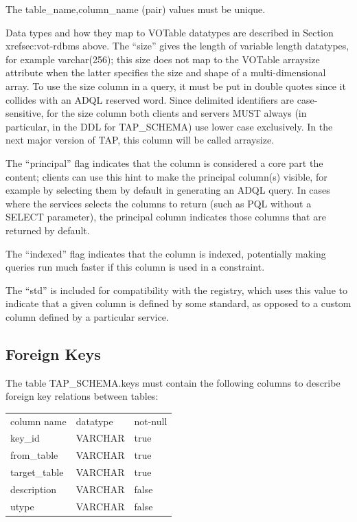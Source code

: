 \documentclass[11pt,letter]{ivoa}
\begin{document}
{The table\_name,column\_name (pair) values must be 
unique.

Data types and how they map to VOTable datatypes are described in Section 
xref{sec:vot-rdbms} above. The “size” gives the length of variable length datatypes, 
for example varchar(256); this size does not map to the VOTable arraysize attribute 
when the latter specifies the size and shape of a multi-dimensional array. To use the 
size column in a query, it must be put in double quotes since it collides with an ADQL reserved 
word. Since delimited identifiers are case-sensitive, for the size column both 
clients and servers MUST always (in particular, in the DDL for 
TAP\_SCHEMA) use lower case exclusively. In the next major version 
of TAP, this column will be called arraysize.

The “principal” flag indicates that the column is considered a core part the 
content; clients can use this hint to make the principal column(s) visible, for 
example by selecting them by default in generating an ADQL query. In cases where 
the services selects the columns to return (such as PQL without a SELECT 
parameter), the principal column indicates those columns that are returned by 
default. 

The “indexed” flag indicates that the column is indexed, potentially 
making queries run much faster if this column is used in a constraint. 

The “std” is included for compatibility with the registry, which uses this value 
to indicate that a given column is defined by some standard, as opposed to a 
custom column defined by a particular service.

\subsection{Foreign Keys}
\label{sec:tap-schema-keys}
The table TAP\_SCHEMA.keys must contain the following columns to 
describe foreign key relations between tables:

\begin{tabular}{l l l}
\label{tab:tap-schema-keys}
column name & datatype & not-null \\
key\_id & VARCHAR & true \\
from\_table & VARCHAR & true \\
target\_table & VARCHAR & true \\
description & VARCHAR & false \\
utype & VARCHAR & false \\
\end{tabular}

}
\end{document}
